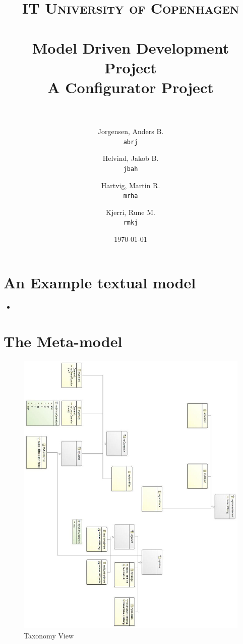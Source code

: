 \documentclass[paper=a4, fontsize=11pt]{scrartcl} %
\title{	
\normalfont \normalsize 
\textsc{IT University of Copenhagen} \\ [25pt] %
\horrule{0.5pt} \\[0.4cm] %
\huge Model Driven Development Project \\ %
\large A Configurator Project \\ %
\horrule{2pt} \\[0.5cm] %
}
\author{
  Jorgensen, Anders B.\\
  \texttt{abrj}
  \and
  Helvind, Jakob B.\\
  \texttt{jbah}
  \and
  Hartvig, Martin R.\\
  \texttt{mrha}
  \and
  Kjerri, Rune M.\\
  \texttt{rmkj}
}
\date{\normalsize\today} %
\numberwithin{equation}{section} %
\numberwithin{figure}{section} %
\numberwithin{table}{section} %
\newcommand{\java}[2]{
\begin{itemize}
\item[]
\end{itemize}
}
\begin{document}
\maketitle %
\newpage


\section{An Example textual model}
\java{../configproject/runtime-CarFactory/src/factory.smdpdsl}{Concrete syntax}

\section{The Meta-model}
\begin{figure}[H]
\centering
\includegraphics[scale=0.6]{pictures/taxView.jpg}
\caption{Taxonomy View}
\end{figure}
\end{document}

